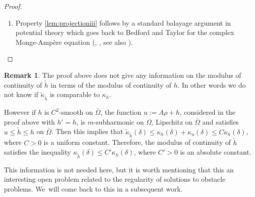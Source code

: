\documentclass[JEP,XML,SOM,Unicode]{cedram}
\theoremstyle{definition}
\newtheorem{remark}[theorem]{Remark}
\begin{document}
\begin{proof}
\begin{enumerate}
\[\tilde{ h} (z + a) \leq \tilde h (z) + \tilde{\kappa}_{\tilde{h}} (\delta) \leq \tilde h (z) + \tilde{\kappa}_{\tilde{h}} (\delta) + \kappa_h (\delta),
\]
where $ \kappa_h (\delta)$ is the modulus of continuity of $h$ on $\bar{\Omega}$. Therefore, by the gluing principle, the function defined by
\[
v (z):=\begin{cases}
\max \{ \tilde h (z), \tilde h (z + a) - \tilde{\kappa}_{\tilde{h}} (\delta) - \kappa_h (\delta)\} &\hbox{if } z \in\Omega \cap \Omega_a \\
\tilde h (z) &\hbox{if } z \in\Omega\setminus\Omega_a
\end{cases}
\]
is $m$-subharmonic on $\Omega$ and satisfies $v \leq h$ on $\bar \Omega$. Hence $v \leq \tilde h$ on $\bar \Omega$ and then
\[
\tilde h (z + a) - \tilde{\kappa}_{\tilde{h}} (\delta) - \kappa_h (\delta) \leq \tilde h (z),
\]
for any $z \in \Omega \cap \Omega_a$ with $\vert a\vert \leq \delta$. This proves that $\tilde{h}$ is uniformly continuous on $\bar{\Omega}$.

\item
Property \eqref{lem:projectioniii} follows by a standard balayage argument in potential theory which goes back to Bedford and Taylor for the complex Monge-Ampère equation (\cite{BT76}, \cite{BT82}, see also \cite{GLZ19}).\qedhere
\end{enumerate}
\end{proof}

\begin{remark}
The proof above does not give any information on the modulus of continuity of $\tilde h$ in terms of the modulus of continuity of $h$. In other words we do not know if $\tilde{\kappa}_{\tilde h}$ is comparable to $\kappa_h$.

However if $h$ is $C^2$-smooth on $\bar \Omega$, the function $u:= A \rho + h$, considered in the proof above with $h'=h$, is $m$-subharmonic on $\Omega$, Lipschitz on $\bar{\Omega}$ and satisfies $u \leq \tilde{h} \leq h$ on $\bar{\Omega}$.
Then this implies that $\tilde{\kappa}_{\tilde{h}} (\delta) \leq \kappa_h (\delta) + \kappa_u (\delta) \leq C \kappa_h (\delta)$, where $C > 0$ is a uniform constant.
Therefore, the modulus of continuity of $\tilde h$ satisfies the inequality $\kappa_{\tilde h}(\delta) \leq C' \kappa_h(\delta)$,
where $C' > 0$ is an absolute constant.

This information is not needed here, but it is worth mentioning that this an interesting open problem related to the regularity of solutions to obstacle problems.
We~will come back to this in a subsequent work.
\end{remark}
\end{document}
